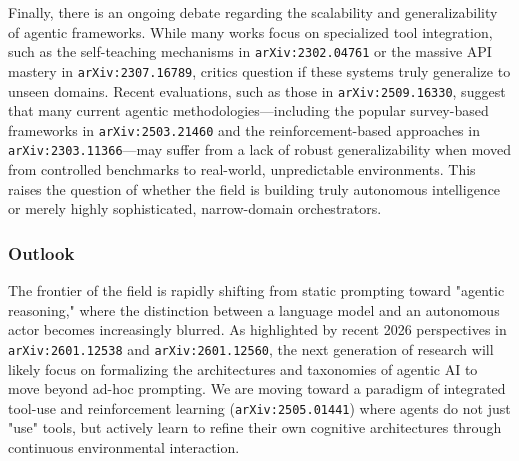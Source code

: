 \documentclass[11pt]{article}
\begin{document}
Finally, there is an ongoing debate regarding the scalability and generalizability of agentic frameworks. While many works focus on specialized tool integration, such as the self-teaching mechanisms in \texttt{arXiv:2302.04761} or the massive API mastery in \texttt{arXiv:2307.16789}, critics question if these systems truly generalize to unseen domains. Recent evaluations, such as those in \texttt{arXiv:2509.16330}, suggest that many current agentic methodologies—including the popular survey-based frameworks in \texttt{arXiv:2503.21460} and the reinforcement-based approaches in \texttt{arXiv:2303.11366}—may suffer from a lack of robust generalizability when moved from controlled benchmarks to real-world, unpredictable environments. This raises the question of whether the field is building truly autonomous intelligence or merely highly sophisticated, narrow-domain orchestrators.

\subsubsection{Outlook}

The frontier of the field is rapidly shifting from static prompting toward "agentic reasoning," where the distinction between a language model and an autonomous actor becomes increasingly blurred. As highlighted by recent 2026 perspectives in \texttt{arXiv:2601.12538} and \texttt{arXiv:2601.12560}, the next generation of research will likely focus on formalizing the architectures and taxonomies of agentic AI to move beyond ad-hoc prompting. We are moving toward a paradigm of integrated tool-use and reinforcement learning (\texttt{arXiv:2505.01441}) where agents do not just "use" tools, but actively learn to refine their own cognitive architectures through continuous environmental interaction.
\end{document}
